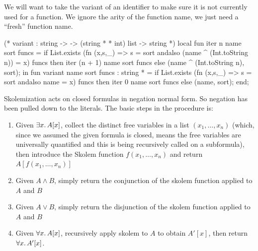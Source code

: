 \begin{node}
We will want to take the variant of an identifier to make sure it is
not currently used for a function. We ignore the arity of the function
name, we just need a ``fresh'' function name.
\end{node}

\nwenddocs{}\endmoddef\nwstartdeflinemarkup{}\nwenddeflinemarkup
(* variant : string ->  -> (string *  * int) list -> string *)
local
  fun iter n name sort funcs =
    if List.exists (fn (x,s,_) =>
                       s = sort andalso
                       (name ^ (Int.toString n)) = x)
                   funcs
    then iter (n + 1) name sort funcs
    else (name ^ (Int.toString n), sort);
in
fun variant name sort funcs : string *  =
  if List.exists (fn (x,s,_) => s = sort andalso name = x)
                 funcs
  then iter 0 name sort funcs
  else (name, sort);
end;
\nwendcode{}\nwdocspar

\begin{node}
Skolemization acts on closed formulas in negation normal form.
So negation has been pulled down to the literals. The basic steps in the procedure is:
\begin{enumerate}
\item Given $\exists x\ldotp A[x]$, collect the distinct free
  variables in a list $(x_{1},\dots,x_{n})$ (which, since we assumed
  the given formula is closed, means the free variables are
  universally quantified and this is being recursively called on a
  subformula), then introduce the Skolem
  function $f(x_{1},\dots,x_{n})$ and return $A[f(x_{1},\dots,x_{n})]$
\item Given $A\land B$, simply return the conjunction of the
  {\Tt{}skolem\nwendquote} function applied to $A$ and $B$
\item Given $A\lor B$, simply return the disjunction of the
  {\Tt{}skolem\nwendquote} function applied to $A$ and $B$
\item Given $\forall x\ldotp A[x]$, recursively apply {\Tt{}skolem\nwendquote} to
  $A$ to obtain $A'[x]$, then return $\forall x\ldotp A'[x]$.
\end{enumerate}
\end{node}

